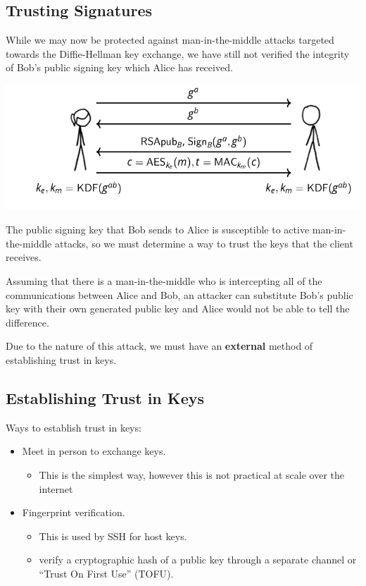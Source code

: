 \documentclass[11pt]{article} %
\begin{document}
\newpage
\subsection{Trusting Signatures}
While we may now be protected against man-in-the-middle attacks targeted towards
the Diffie-Hellman key exchange, we have still not verified the integrity of
Bob's public signing key which Alice has received.

\includegraphics[scale=.7]{./tls4.png}

The public signing key that Bob sends to Alice is susceptible to
active man-in-the-middle attacks, so we must determine a way to trust the keys 
that the client receives.

\bigskip
Assuming that there is a man-in-the-middle who is intercepting all of the
communications between Alice and Bob, an attacker can substitute Bob's public
key with their own generated public key and Alice would not be able to tell 
the difference.

\bigskip
Due to the nature of this attack, we must have an \textbf{external} method of
establishing trust in keys.

\newpage
\subsection{Establishing Trust in Keys}
Ways to establish trust in keys:
\begin{itemize}
  \item Meet in person to exchange keys.
  \begin{itemize}\item This is the simplest way, however this is not practical at scale over the internet
  \end{itemize}
\end{itemize}



\begin{itemize}
  \item Fingerprint verification.
  \begin{itemize}\item This is used by SSH for host keys.  \item verify a cryptographic hash of a public key through a separate channel or “Trust On First Use” (TOFU). 
  \end{itemize}
\end{itemize}
\end{document}
